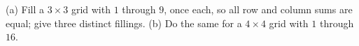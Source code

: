 (a) Fill a $3\times3$ grid with $1$ through $9$, once each, so all row and column sums are equal; give three distinct fillings. (b) Do the same for a $4\times4$ grid with $1$ through $16$.
